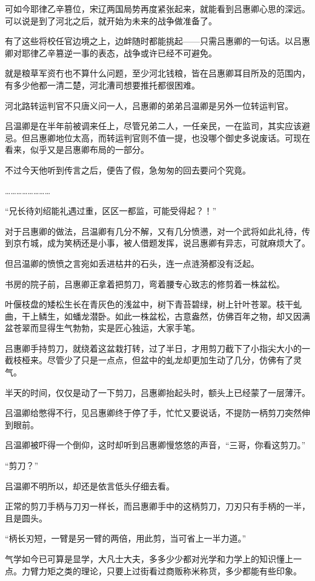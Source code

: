 可如今耶律乙辛篡位，宋辽两国局势再度紧张起来，就能看到吕惠卿心思的深远。可以说是到了河北之后，就开始为未来的战争做准备了。

有了这些将校任官边境之上，边衅随时都能挑起——只需吕惠卿的一句话。以吕惠卿对耶律乙辛篡逆一事的表态，战争或许已经不可避免。

就是粮草军资冇也不算什么问题，至少河北钱粮，皆在吕惠卿耳目所及的范围内，有多少他都一清二楚，河北漕司想要推托都很困难。

河北路转运判官不只唐义问一人，吕惠卿的弟弟吕温卿是另外一位转运判官。

吕温卿是在半年前被调来任上，尽管兄弟二人，一任亲民，一在监司，其实应该避忌。但吕惠卿地位太高，而转运判官则不值一提，也没哪个御史多说废话。可现在看来，似乎又是吕惠卿布局的一部分。

不过今天他听到传言之后，便告了假，急匆匆的回去要问个究竟。

……………………

“兄长待刘绍能礼遇过重，区区一都监，可能受得起？！”

对于吕惠卿的做法，吕温卿有几分不解，又有几分愤懑，对一个武将如此礼待，传到京冇城，成为笑柄还是小事，被人借题发挥，说吕惠卿有异志，可就麻烦大了。

但吕温卿的愤愤之言宛如丢进枯井的石头，连一点涟漪都没有泛起。

书房的院子前，吕惠卿正拿着把剪刀，弯着腰专心致志的修剪着一株盆松。

叶偃枝盘的矮松生长在青灰色的浅盆中，树下青苔碧绿，树上针叶苍翠。枝干虬曲，干上鳞生，如蟠龙潜卧。如此一株盆松，古意盎然，仿佛百年之物，却又因满盆苍翠而显得生气勃勃，实是匠心独运，大家手笔。

吕惠卿手持剪刀，就绕着这盆栽打转，过了半日，才用剪刀截下了小指尖大小的一截枝桠来。尽管少了只是一点点，但盆中的虬龙却更加生动了几分，仿佛有了灵气。

半天的时间，仅仅是动了一下剪刀，吕惠卿抬起头时，额头上已经蒙了一层薄汗。

吕温卿给憋得不行，见吕惠卿终于停了手，忙忙又要说话，不提防一柄剪刀突然伸到眼前。

吕温卿被吓得一个倒仰，这时却听到吕惠卿慢悠悠的声音，“三哥，你看这剪刀。”

“剪刀？”

吕温卿不明所以，却还是依言低头仔细去看。

正常的剪刀手柄与刀刃一样长，而吕惠卿手中的这柄剪刀，刀刃只有手柄的一半，且是圆头。

“柄长刃短，一臂是另一臂的两倍，用此剪，当可省上一半力道。”

气学如今已可算是显学，大凡士大夫，多多少少都对光学和力学上的知识懂上一点。力臂力矩之类的理论，只要上过街看过商贩称米称货，多少都能有些印象。

